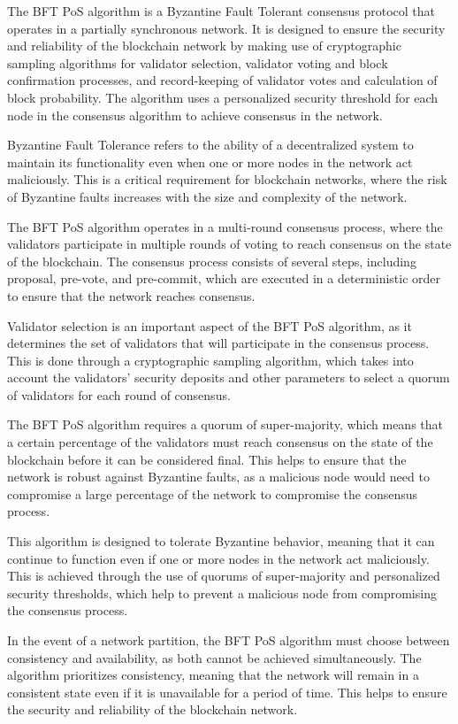 The BFT PoS algorithm is a Byzantine Fault Tolerant consensus protocol that operates in a partially synchronous network. It is designed to ensure the security and reliability of the blockchain network by making use of cryptographic sampling algorithms for validator selection, validator voting and block confirmation processes, and record-keeping of validator votes and calculation of block probability. The algorithm uses a personalized security threshold for each node in the consensus algorithm to achieve consensus in the network.

Byzantine Fault Tolerance \cite{lamport2019byzantine} refers to the ability of a decentralized system to maintain its functionality even when one or more nodes in the network act maliciously. This is a critical requirement for blockchain networks, where the risk of Byzantine faults increases with the size and complexity of the network.

The BFT PoS algorithm operates in a multi-round consensus process, where the validators participate in multiple rounds of voting to reach consensus on the state of the blockchain. The consensus process consists of several steps, including proposal, pre-vote, and pre-commit, which are executed in a deterministic order to ensure that the network reaches consensus.

Validator selection is an important aspect of the BFT PoS algorithm, as it determines the set of validators that will participate in the consensus process. This is done through a cryptographic sampling algorithm, which takes into account the validators' security deposits and other parameters to select a quorum of validators for each round of consensus.

The BFT PoS algorithm requires a quorum of super-majority, which means that a certain percentage of the validators must reach consensus on the state of the blockchain before it can be considered final. This helps to ensure that the network is robust against Byzantine faults, as a malicious node would need to compromise a large percentage of the network to compromise the consensus process.

This algorithm is designed to tolerate Byzantine behavior, meaning that it can continue to function even if one or more nodes in the network act maliciously. This is achieved through the use of quorums of super-majority and personalized security thresholds, which help to prevent a malicious node from compromising the consensus process.

In the event of a network partition, the BFT PoS algorithm must choose between consistency and availability, as both cannot be achieved simultaneously. The algorithm prioritizes consistency, meaning that the network will remain in a consistent state even if it is unavailable for a period of time. This helps to ensure the security and reliability of the blockchain network.

